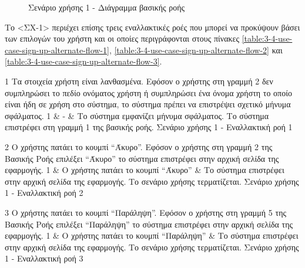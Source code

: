 \begin{figure}[H]
    \centering
    
    \caption{Σενάριο χρήσης 1 - Διάγραμμα βασικής ροής}
    \label{figure:3-4-use-case-sign-up-base-flow-sequence-diagram}
\end{figure}


Το <ΣΧ-1> περιέχει επίσης τρεις εναλλακτικές ροές που μπορεί να προκύψουν βάσει των επιλογών του χρήστη και οι οποίες περιγράφονται στους πίνακες \ref{table:3-4-use-case-sign-up-alternate-flow-1}, \ref{table:3-4-use-case-sign-up-alternate-flow-2} και \ref{table:3-4-use-case-sign-up-alternate-flow-3}.

\useCaseAlternateFlowTable
{1}
{Τα στοιχεία χρήστη είναι λανθασμένα.}
{Εφόσον ο χρήστης στη γραμμή 2 δεν συμπληρώσει το πεδίο ονόματος χρήστη ή συμπληρώσει ένα όνομα χρήστη το οποίο είναι ήδη σε χρήση στο σύστημα, το σύστημα πρέπει να επιστρέψει σχετικό μήνυμα σφάλματος.}
{
    1 & - & Το σύστημα εμφανίζει μήνυμα σφάλματος.
}
{Το σύστημα επιστρέφει στη γραμμή 1 της βασικής ροής.}
{Σενάριο χρήσης 1 - Εναλλακτική ροή 1}
{\label{table:3-4-use-case-sign-up-alternate-flow-1}}

\useCaseAlternateFlowTable
{2}
{Ο χρήστης πατάει το κουμπί ``Άκυρο''.}
{Εφόσον ο χρήστης στη γραμμή 2 της Βασικής Ροής επιλέξει ``Άκυρο'' το σύστημα επιστρέφει στην αρχική σελίδα της εφαρμογής.}
{
    1 & Ο χρήστης πατάει το κουμπί ``Άκυρο'' & Το σύστημα επιστρέφει στην αρχική σελίδα της εφαρμογής.
}
{Το σενάριο χρήσης τερματίζεται.}
{Σενάριο χρήσης 1 - Εναλλακτική ροή 2}
{\label{table:3-4-use-case-sign-up-alternate-flow-2}}

\useCaseAlternateFlowTable
{3}
{Ο χρήστης πατάει το κουμπί ``Παράληψη''.}
{Εφόσον ο χρήστης στη γραμμή 5 της Βασικής Ροής επιλέξει ``Παράληψη'' το σύστημα επιστρέφει στην αρχική σελίδα της εφαρμογής.}
{
    1 & Ο χρήστης πατάει το κουμπί ``Παράληψη'' & Το σύστημα επιστρέφει στην αρχική σελίδα της εφαρμογής.
}
{Το σενάριο χρήσης τερματίζεται.}
{Σενάριο χρήσης 1 - Εναλλακτική ροή 3}
{\label{table:3-4-use-case-sign-up-alternate-flow-3}}
